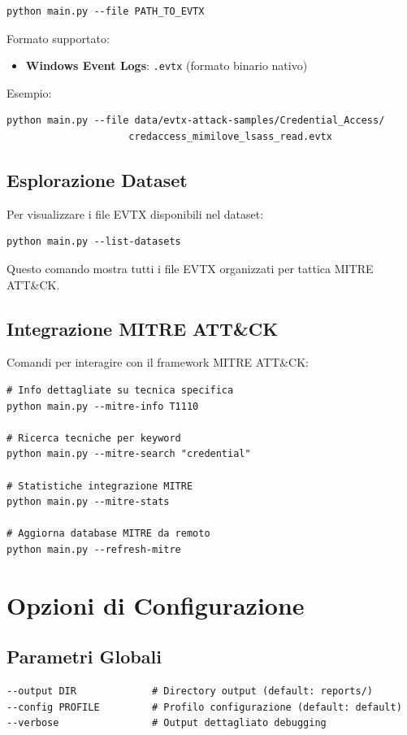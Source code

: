 \documentclass[12pt,a4paper]{report}
\theoremstyle{definition}
\begin{document}
\begin{verbatim}
python main.py --file PATH_TO_EVTX
\end{verbatim}

Formato supportato:
\begin{itemize}
\item \textbf{Windows Event Logs}: \texttt{.evtx} (formato binario nativo)
\end{itemize}

Esempio:
\begin{verbatim}
python main.py --file data/evtx-attack-samples/Credential_Access/
                     credaccess_mimilove_lsass_read.evtx
\end{verbatim}

\subsection{Esplorazione Dataset}
Per visualizzare i file EVTX disponibili nel dataset:

\begin{verbatim}
python main.py --list-datasets
\end{verbatim}

Questo comando mostra tutti i file EVTX organizzati per tattica MITRE ATT\&CK.

\subsection{Integrazione MITRE ATT\&CK}
Comandi per interagire con il framework MITRE ATT\&CK:

\begin{verbatim}
# Info dettagliate su tecnica specifica
python main.py --mitre-info T1110

# Ricerca tecniche per keyword
python main.py --mitre-search "credential"

# Statistiche integrazione MITRE
python main.py --mitre-stats

# Aggiorna database MITRE da remoto
python main.py --refresh-mitre
\end{verbatim}

\section{Opzioni di Configurazione}

\subsection{Parametri Globali}
\begin{verbatim}
--output DIR             # Directory output (default: reports/)
--config PROFILE         # Profilo configurazione (default: default)
--verbose                # Output dettagliato debugging
\end{verbatim}
\end{document}
